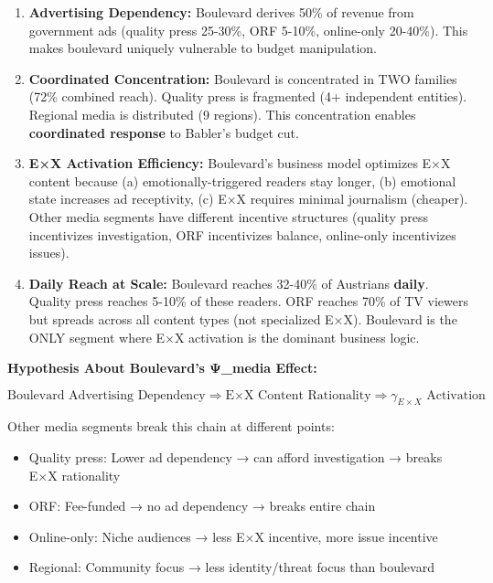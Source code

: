 \begin{enumerate}
\item \textbf{Advertising Dependency:} Boulevard derives 50\% of revenue from government ads
  (quality press 25-30\%, ORF 5-10\%, online-only 20-40\%). This makes boulevard uniquely
  vulnerable to budget manipulation.

\item \textbf{Coordinated Concentration:} Boulevard is concentrated in TWO families (72\% combined reach).
  Quality press is fragmented (4+ independent entities). Regional media is distributed (9 regions).
  This concentration enables \textbf{coordinated response} to Babler's budget cut.

\item \textbf{E×X Activation Efficiency:} Boulevard's business model optimizes E×X content because
  (a) emotionally-triggered readers stay longer, (b) emotional state increases ad receptivity,
  (c) E×X requires minimal journalism (cheaper). Other media segments have different
  incentive structures (quality press incentivizes investigation, ORF incentivizes balance,
  online-only incentivizes issues).

\item \textbf{Daily Reach at Scale:} Boulevard reaches 32-40\% of Austrians \textbf{daily}.
  Quality press reaches 5-10\% of these readers. ORF reaches 70\% of TV viewers but spreads
  across all content types (not specialized E×X). Boulevard is the ONLY segment where
  E×X activation is the dominant business logic.

\end{enumerate}

\textbf{Hypothesis About Boulevard's Ψ\_media Effect:}

\[
\text{Boulevard Advertising Dependency} \Rightarrow \text{E×X Content Rationality} \Rightarrow \gamma_{E \times X} \text{ Activation}
\]

Other media segments break this chain at different points:
\begin{itemize}
\item Quality press: Lower ad dependency → can afford investigation → breaks E×X rationality
\item ORF: Fee-funded → no ad dependency → breaks entire chain
\item Online-only: Niche audiences → less E×X incentive, more issue incentive
\item Regional: Community focus → less identity/threat focus than boulevard
\end{itemize}

